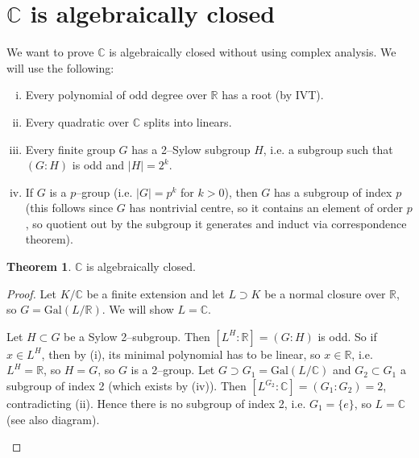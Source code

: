 \documentclass{article}
\theoremstyle{definition}
\newtheorem{theorem}{Theorem}[section]
\begin{document}
\section{$\mathbb{C}$ is algebraically closed}
We want to prove $\mathbb{C}$ is algebraically closed without using complex analysis. We will use the following:
\begin{enumerate}[(i)]
    \item Every polynomial of odd degree over $\mathbb{R}$ has a root (by IVT).
    \item Every quadratic over $\mathbb{C}$ splits into linears.
    \item Every finite group $G$ has a 2--Sylow subgroup $H$, i.e. a subgroup such that $(G:H)$ is odd and $|H|=2^k$.
    \item If $G$ is a $p$--group (i.e. $|G|=p^k$ for $k>0$), then $G$ has a subgroup of index $p$ (this follows since $G$ has nontrivial centre, so it contains an element of order $p$, so quotient out by the subgroup it generates and induct via correspondence theorem).
\end{enumerate}
\begin{theorem}
    $\mathbb{C}$ is algebraically closed.
\end{theorem}
\begin{proof}
    Let $K/\mathbb{C}$ be a finite extension and let $L \supset K$ be a normal closure over $\mathbb{R}$, so $G=\text{Gal}(L/\mathbb{R})$. We will show $L=\mathbb{C}$.
    \vspace{1mm}
    
    Let $H \subset G$ be a Sylow 2--subgroup. Then $[L^H : \mathbb{R}] = (G:H)$ is odd. So if $x \in L^H$, then by (i), its minimal polynomial has to be linear, so $x \in \mathbb{R}$, i.e. $L^H=\mathbb{R}$, so $H=G$, so $G$ is a 2--group. Let $G \supset G_1 = \text{Gal}(L/\mathbb{C})$ and $G_2 \subset G_1$ a subgroup of index 2 (which exists by (iv)). Then $[L^{G_2}:\mathbb{C}]=(G_1 : G_2) = 2$, contradicting (ii). Hence there is no subgroup of index 2, i.e. $G_1=\{e\}$, so $L=\mathbb{C}$ (see also diagram).
    \begin{figure}[H]
        \centering
    \end{figure}
\end{proof}
\end{document}

